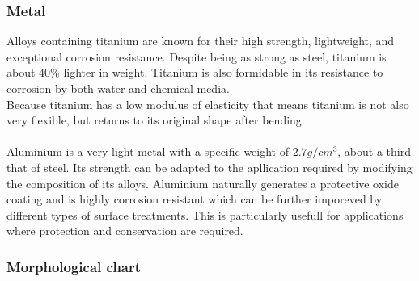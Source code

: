 \documentclass[11pt, a4paper]{article}
\begin{document}
\subsubsection{Metal}
Alloys containing titanium are known for their high strength, lightweight, and exceptional corrosion resistance.
Despite being as strong as steel, titanium is about 40\% lighter in weight.
Titanium is also formidable in its resistance to corrosion by both water and chemical media.
\\
Because titanium has a low modulus of elasticity that means titanium is not also very flexible, but returns to its original shape after bending.
\\ \\
Aluminium is a very light metal with a specific weight of $2.7 g/cm^3$, about a third that of steel.
Its strength can be adapted to the apllication required by modifying the composition of its alloys.
Aluminium naturally generates a protective oxide coating and is highly corrosion resistant which can be further imporeved by different types of surface treatments. 
This is particularly usefull for applications where protection and conservation are required.

\subsubsection{Morphological chart}
\end{document}

